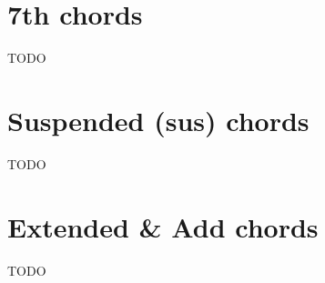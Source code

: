 \newpage

\section{7th chords}
TODO

\newpage

\section{Suspended (sus) chords}
TODO

\newpage

\section{Extended \& Add chords}
TODO
